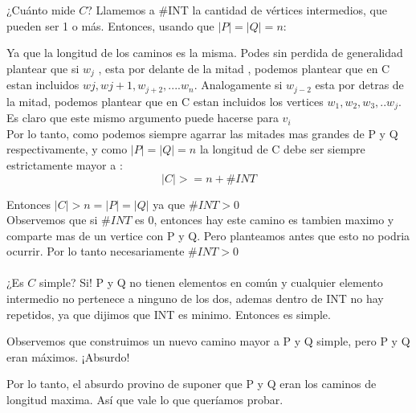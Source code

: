 \documentclass{article}
\begin{document}
¿Cuánto mide $C$? Llamemos a \#INT la cantidad de vértices intermedios, que pueden ser 1 o más. Entonces, usando que $|P| = |Q| = n$:

Ya que la longitud de los caminos es la misma. Podes sin perdida de generalidad plantear  que si $w_j$ , esta por delante de la mitad , podemos plantear que en C estan incluidos $wj,w{j+1},w_{j+2},.... w_n$. Analogamente si $w_{j-2}$ esta por detras de la mitad, podemos plantear que en C estan incluidos los vertices $w_{1},w_{2},w_{3},.. w_{j}.$ Es claro que este mismo argumento puede hacerse para $v_i$\\

Por lo tanto, como podemos siempre agarrar las mitades mas grandes de P y Q respectivamente, y como $|P| = |Q| = n$ la longitud de C debe ser siempre estrictamente mayor a :\\
        \[|C| >= n + \#INT \] 



Entonces $|C| > n = |P| = |Q|$ ya que  $ \#INT > 0$\\
Observemos que si $\#INT$ es 0, entonces hay este camino es tambien maximo y comparte mas de un vertice con P y Q. Pero planteamos antes que esto no podria ocurrir. Por lo tanto necesariamente $\#INT > 0$\\ \\
¿Es $C$ simple? Si! P y Q no tienen elementos en común y cualquier elemento intermedio no pertenece a ninguno de los dos, ademas dentro de INT no hay repetidos, ya que dijimos que INT es minimo. Entonces es simple.

Observemos que  construimos un nuevo camino mayor a P y Q simple, pero P y Q eran máximos. ¡Absurdo!

Por lo tanto, el absurdo provino de suponer que P y Q eran los caminos de longitud maxima. Así que vale lo que queríamos probar.
\end{document}
